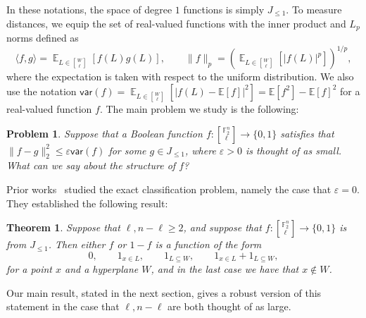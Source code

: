 \documentclass[11pt]{article}
\newtheorem{thm}{Theorem}[section]
\newtheorem{problem}{Problem}
\newcommand\E{\mathbb{E}}
\newcommand\card[1]{\left| {#1} \right|}
\newcommand\norm[1]{\| #1 \|}
\newcommand\Expect[2]{{\mathop{\mathbb{E}}_{#1}\left[ {#2} \right]}}
\newcommand\inner[2]{\langle{#1},{#2}\rangle}
\newcommand\eps{\varepsilon}
\renewcommand\geq{\geqslant}
\renewcommand\leq{\leqslant}
\providecommand{\sqbinom}[2]{\genfrac{[}{]}{0pt}{}{#1}{#2}}
\begin{document}
In these notations, the space of degree $1$ functions is simply $J_{\leq 1}$. To measure distances, we equip the set of real-valued functions with the inner product and $L_p$ norms defined as
\[
\inner{f}{g}=\Expect{L\in {\sqbinom{W}{\ell}}}{f(L)g(L)},
\qquad
\norm{f}_p=\left(\Expect{L\in{\sqbinom{W}{\ell}}}{\card{f(L)}^p}\right)^{1/p},
\]
where the expectation is taken with respect to the uniform distribution. We also use the notation $\mathsf{var}(f) = \Expect{L\in {\sqbinom{W}{\ell}}}{\card{f(L)-\E[f]}^2} = \E[f^2]-\E[f]^2$ for a real-valued function $f$.
The main problem we study is the following:
\begin{problem}\label{problem:main}
    Suppose that a Boolean function $f\colon \sqbinom{\mathbb{F}_2^n}{\ell}\to\{0,1\}$ satisfies that $\norm{f-g}_2^2\leq \eps\mathsf{var}(f)$ for some $g\in J_{\leq 1}$, where $\eps>0$ is thought of as small. What can we say about the structure of $f$?
\end{problem}
Prior works~\cite{FilmusIhringer,Ihringer2023Classification,Filmus2026Grassmann} studied the exact classification problem, namely the case that $\eps=0$. They established the following result:
\begin{thm}\label{thm:exact}
    Suppose that $\ell,n-\ell\geq 2$, and suppose that $f\colon {\sqbinom{\mathbb{F}_2^n}{\ell}}\to\{0,1\}$ is from $J_{\leq 1}$. Then either $f$ or $1-f$ is a function of the form
    \[
    0,\qquad 1_{x\in L},\qquad 1_{L\subseteq W},\qquad 1_{x\in L}+1_{L\subseteq W},
    \]
    for a point $x$ and a hyperplane $W$, and in the last case we have that $x\not\in W$.
\end{thm}
Our main result, stated in the next section, gives a robust version of this statement in the case that $\ell,n-\ell$ are both thought of as large.

 
\end{document}
